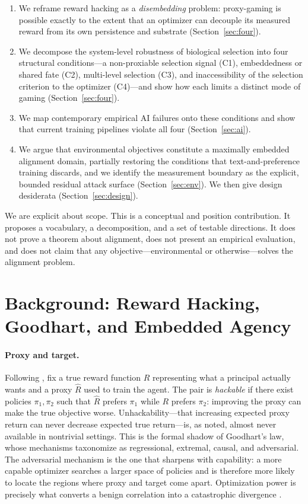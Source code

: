 \documentclass[11pt]{article}
\begin{document}
\begin{enumerate}[leftmargin=1.4em,itemsep=0.15em]
\item We reframe reward hacking as a \emph{disembedding} problem: proxy-gaming is possible exactly to the extent that an optimizer can decouple its measured reward from its own persistence and substrate (Section~\ref{sec:four}).
\item We decompose the system-level robustness of biological selection into four structural conditions---a non-proxiable selection signal (C1), embeddedness or shared fate (C2), multi-level selection (C3), and inaccessibility of the selection criterion to the optimizer (C4)---and show how each limits a distinct mode of gaming (Section~\ref{sec:four}).
\item We map contemporary empirical AI failures onto these conditions and show that current training pipelines violate all four (Section~\ref{sec:ai}).
\item We argue that environmental objectives constitute a maximally embedded alignment domain, partially restoring the conditions that text-and-preference training discards, and we identify the measurement boundary as the explicit, bounded residual attack surface (Section~\ref{sec:env}). We then give design desiderata (Section~\ref{sec:design}).
\end{enumerate}

We are explicit about scope. This is a conceptual and position contribution. It proposes a vocabulary, a decomposition, and a set of testable directions. It does not prove a theorem about alignment, does not present an empirical evaluation, and does not claim that any objective---environmental or otherwise---solves the alignment problem.

\section{Background: Reward Hacking, Goodhart, and Embedded Agency}

\paragraph{Proxy and target.} Following \citet{skalse2022}, fix a true reward function $R$ representing what a principal actually wants and a proxy $\hat{R}$ used to train the agent. The pair is \emph{hackable} if there exist policies $\pi_1, \pi_2$ such that $\hat{R}$ prefers $\pi_1$ while $R$ prefers $\pi_2$: improving the proxy can make the true objective worse. Unhackability---that increasing expected proxy return can never decrease expected true return---is, as noted, almost never available in nontrivial settings. This is the formal shadow of Goodhart's law, whose mechanisms \citet{manheim2018} taxonomize as regressional, extremal, causal, and adversarial. The adversarial mechanism is the one that sharpens with capability: a more capable optimizer searches a larger space of policies and is therefore more likely to locate the regions where proxy and target come apart. Optimization power is precisely what converts a benign correlation into a catastrophic divergence \citep{manheim2018,hubinger2019}.
\end{document}
